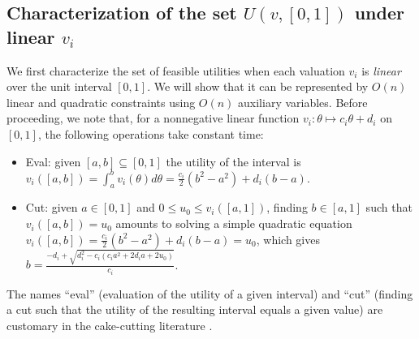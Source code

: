 \subsection{Characterization of the set $U(v, [0,1])$ under linear $v_i$} \label{subseq:charact-linear-vi-[0,1]}
We first characterize the set of feasible utilities when each valuation $v_i$ is \emph{linear} over the unit interval $[0,1]$. 
We will show that it can be represented by $O(n)$ linear and quadratic constraints using $O(n)$ auxiliary variables. Before proceeding, we note that, for a nonnegative linear function $v_i: \theta \mapsto c_i \theta + d_i$ on $[0,1]$, the following operations take constant time:
\begin{itemize}
	\item Eval: given $[a,b] \subseteq [0,1]$ the utility of the interval is 
	$ v_i([a,b]) = \int_a^b v_i(\theta)d\theta = \frac{c_i}{2} (b^2 - a^2) + d_i (b-a)$.
	\item Cut: given $a \in [0,1]$ and $0\leq u_0 \leq v_i([a, 1])$, finding $b\in [a,1]$ such that $v_i([a,b]) = u_0$ amounts to solving a simple quadratic equation
	$v_i([a,b]) = \frac{c_i}{2}(b^2 - a^2) + d_i(b-a) = u_0$, which gives $b = \frac{-d_i + \sqrt{d_i^2 - c_i(c_i a^2 + 2d_ia+2u_0)}}{c_i}$.
\end{itemize}
The names ``eval'' (evaluation of the utility of a given interval) and ``cut'' (finding a cut such that the utility of the resulting interval equals a given value) are customary in the cake-cutting literature \citep{procaccia2014cake,robertson1998cake}.


